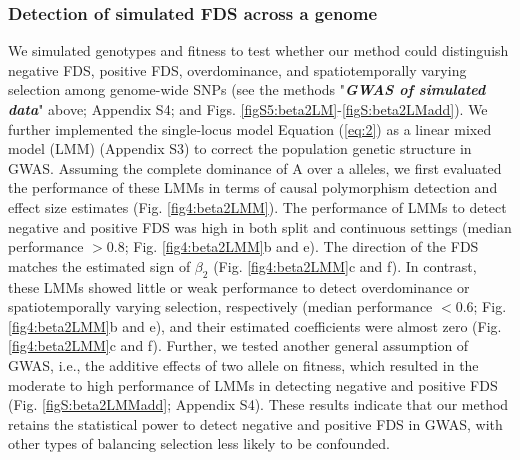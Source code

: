 \documentclass[12pt,]{article}
\begin{document}
\subsubsection{Detection of simulated FDS across a genome}
We simulated genotypes and fitness to test whether our method could distinguish negative FDS, positive FDS, overdominance, and spatiotemporally varying selection among genome-wide SNPs (see the methods "\textit{\textbf{GWAS of simulated data}}" above; Appendix S4; and Figs. \ref{figS5:beta2LM}-\ref{figS:beta2LMadd}). We further implemented the single-locus model Equation (\ref{eq:2}) as a linear mixed model (LMM) (Appendix S3) to correct the population genetic structure in GWAS. Assuming the complete dominance of A over a alleles, we first evaluated the performance of these LMMs in terms of causal polymorphism detection and effect size estimates (Fig. \ref{fig4:beta2LMM}). The performance of LMMs to detect negative and positive FDS was high in both split and continuous settings (median performance $>0.8$; Fig. \ref{fig4:beta2LMM}b and e). The direction of the FDS matches the estimated sign of $\beta_2$ (Fig. \ref{fig4:beta2LMM}c and f). In contrast, these LMMs showed little or weak performance to detect overdominance or spatiotemporally varying selection, respectively (median performance $< 0.6$; Fig. \ref{fig4:beta2LMM}b and e), and their estimated coefficients were almost zero (Fig. \ref{fig4:beta2LMM}c and f). Further, we tested another general assumption of GWAS, i.e., the additive effects of two allele on fitness, which resulted in the moderate to high performance of LMMs in detecting negative and positive FDS (Fig. \ref{figS:beta2LMMadd}; Appendix S4). These results indicate that our method retains the statistical power to detect negative and positive FDS in GWAS, with other types of balancing selection less likely to be confounded. 
\end{document}

